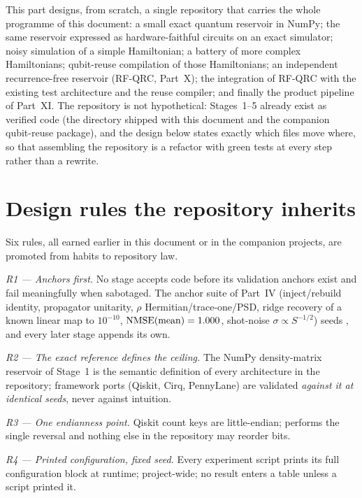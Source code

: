 
This part designs, from scratch, a single repository that carries the whole
programme of this document: a small exact quantum reservoir in NumPy; the same
reservoir expressed as hardware-faithful circuits on an exact simulator; noisy
simulation of a simple Hamiltonian; a battery of more complex Hamiltonians;
qubit-reuse compilation of those Hamiltonians; an independent recurrence-free
reservoir (RF-QRC, Part~X); the integration of RF-QRC with the existing test
architecture and the reuse compiler; and finally the product pipeline of
Part~XI. The repository is not hypothetical: Stages~1--5 already exist as
verified code (the  directory shipped with this document and the
companion qubit-reuse package), and the design below states exactly which
files move where, so that assembling the repository is a refactor with green
tests at every step rather than a rewrite.

\section{Design rules the repository inherits}
\label{sec:repo-rules}

Six rules, all earned earlier in this document or in the companion projects,
are promoted from habits to repository law.

\emph{R1 --- Anchors first.} No stage accepts code before its validation
anchors exist and fail meaningfully when sabotaged. The anchor suite of
Part~IV (inject/rebuild identity, propagator unitarity, $\rho$
Hermitian/trace-one/PSD, ridge recovery of a known linear map to $10^{-10}$,
$\mathrm{NMSE}(\text{mean})=1.000$, shot-noise $\sigma \propto S^{-1/2}$) seeds
, and every later stage appends its own.

\emph{R2 --- The exact reference defines the ceiling.} The NumPy
density-matrix reservoir of Stage~1 is the semantic definition of every
architecture in the repository; framework ports (Qiskit, Cirq, PennyLane) are
validated \emph{against it at identical seeds}, never against intuition.

\emph{R3 --- One endianness point.} Qiskit count keys are little-endian;
 performs the single  reversal and
nothing else in the repository may reorder bits.

\emph{R4 --- Printed configuration, fixed seed.} Every experiment script
prints its full configuration block at runtime;  project-wide;
no result enters a table unless a script printed it.


